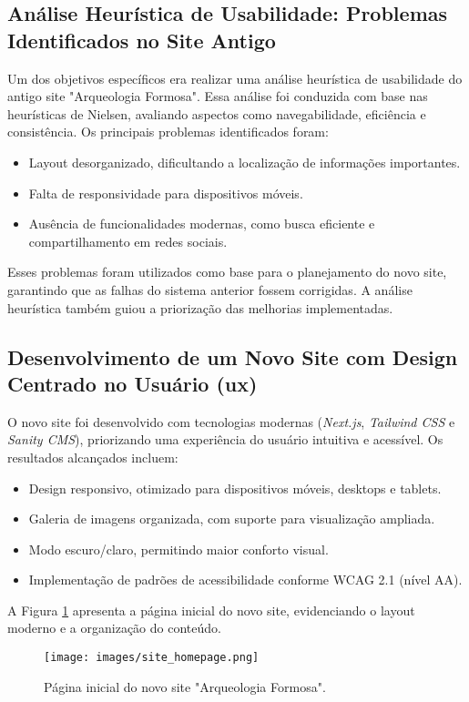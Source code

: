 \subsection{Análise Heurística de Usabilidade: Problemas Identificados no Site Antigo}
Um dos objetivos específicos era realizar uma análise heurística de usabilidade do antigo site "Arqueologia Formosa". Essa análise foi conduzida com base nas heurísticas de Nielsen, avaliando aspectos como navegabilidade, eficiência e consistência. Os principais problemas identificados foram:
\begin{itemize}
    \item Layout desorganizado, dificultando a localização de informações importantes.
    \item Falta de responsividade para dispositivos móveis.
    \item Ausência de funcionalidades modernas, como busca eficiente e compartilhamento em redes sociais.
\end{itemize}

Esses problemas foram utilizados como base para o planejamento do novo site, garantindo que as falhas do sistema anterior fossem corrigidas. A análise heurística também guiou a priorização das melhorias implementadas.

\subsection{Desenvolvimento de um Novo Site com Design Centrado no Usuário (\gls{ux})}
O novo site foi desenvolvido com tecnologias modernas (\textit{Next.js}, \textit{Tailwind CSS} e \textit{Sanity CMS}), priorizando uma experiência do usuário intuitiva e acessível. Os resultados alcançados incluem:
\begin{itemize}
    \item Design responsivo, otimizado para dispositivos móveis, desktops e tablets.
    \item Galeria de imagens organizada, com suporte para visualização ampliada.
    \item Modo escuro/claro, permitindo maior conforto visual.
    \item Implementação de padrões de acessibilidade conforme WCAG 2.1 (nível AA).
\end{itemize}

A Figura \ref{fig:site_homepage} apresenta a página inicial do novo site, evidenciando o layout moderno e a organização do conteúdo.

\begin{figure}[H]
    \centering
    \texttt{[image: images/site\_homepage.png]}
    \caption{Página inicial do novo site "Arqueologia Formosa".}
    \label{fig:site_homepage}
\end{figure}

